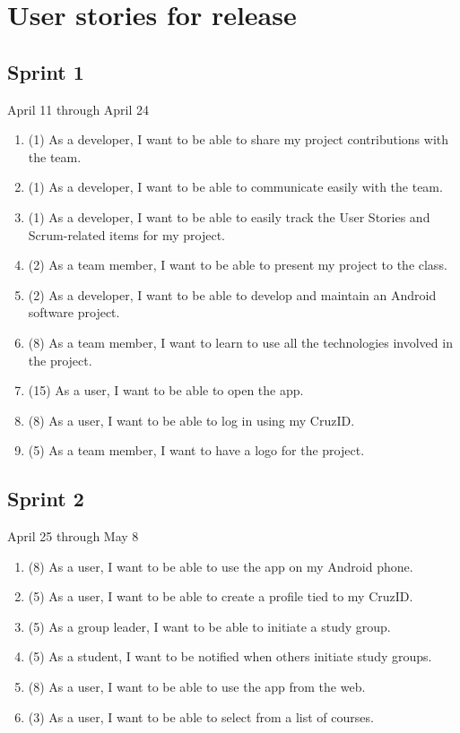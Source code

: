 \documentclass[10pt]{article}
\begin{document}
    \section{User stories for release}

    \subsection{Sprint 1}
    April 11 through April 24
    \begin{enumerate}
        \item (1) As a developer, I want to be able to share my project contributions with the team.
        \item (1) As a developer, I want to be able to communicate easily with the team.
        \item (1) As a developer, I want to be able to easily track the User Stories and Scrum-related items for my project.
        \item (2) As a team member, I want to be able to present my project to the class.
        \item (2) As a developer, I want to be able to develop and maintain an Android software project.
        \item (8) As a team member, I want to learn to use all the technologies involved in the project. 
        \item (15) As a user, I want to be able to open the app.
        \item (8) As a user, I want to be able to log in using my CruzID.
        \item (5) As a team member, I want to have a logo for the project.
    \end{enumerate}

    \subsection{Sprint 2}
    April 25 through May 8
    \begin{enumerate}
        \item (8) As a user, I want to be able to use the app on my Android phone.
        \item (5) As a user, I want to be able to create a profile tied to my CruzID.
        \item (5) As a group leader, I want to be able to initiate a study group.
        \item (5) As a student, I want to be notified when others initiate study groups.
        \item (8) As a user, I want to be able to use the app from the web.
        \item (3) As a user, I want to be able to select from a list of courses.
    \end{enumerate}
    
\end{document}
